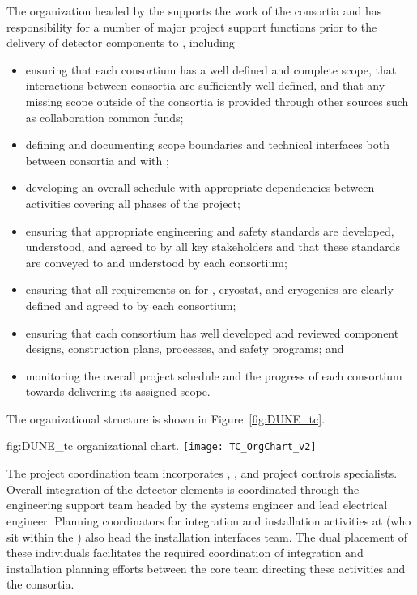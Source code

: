 The  organization headed by the  supports the work of 
the consortia and has responsibility for a number of major project 
support functions prior to the delivery of detector components to 
, including
\begin{itemize}
\item ensuring that each consortium has a well defined and complete
  scope, that interactions between consortia are sufficiently 
  well defined, and that any missing scope outside of the 
  consortia is provided through other sources such as collaboration
  common funds;
\item defining and documenting scope boundaries and technical 
  interfaces both between consortia and with ;  
\item developing an overall schedule with appropriate dependencies
  between activities covering all phases of the project; 
\item ensuring that appropriate engineering and safety standards 
  are developed, understood, and agreed to by all key stakeholders 
  and that these standards are conveyed to and understood by each
  consortium;
\item ensuring that all  requirements on  
  for , cryostat, and cryogenics are clearly defined and 
  agreed to by each consortium;
\item ensuring that each consortium has well developed and reviewed
  component designs, construction plans,  processes, and 
  safety programs; and
\item monitoring the overall project schedule and the progress of 
  each consortium towards delivering its assigned scope. 
\end{itemize}
The   organizational structure is shown 
in Figure~\ref{fig:DUNE_tc}. 
\begin{dunefigure}{fig:DUNE_tc}
  {  organizational chart.}
  \texttt{[image: TC\_OrgChart\_v2]}
\end{dunefigure}

The  project coordination team incorporates , 
, and project controls specialists.  Overall integration 
of the detector elements is coordinated through the  
engineering support team headed by the  systems 
engineer and lead  electrical engineer.  Planning 
coordinators for integration and installation activities at 
 (who sit within the  ) also head the  installation interfaces team.  
The dual placement of these individuals facilitates the required 
coordination of integration and installation planning efforts between 
the core team directing these activities and the  
consortia. %

